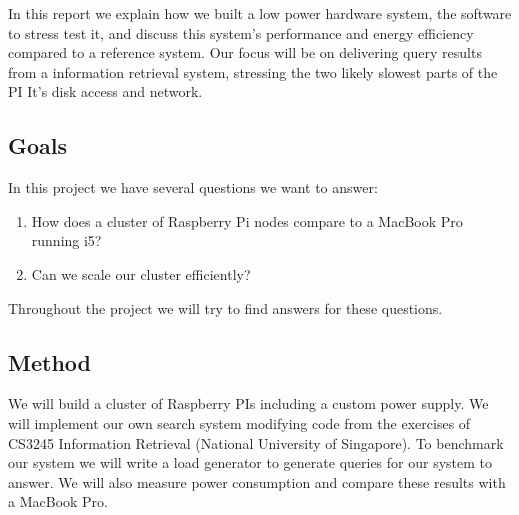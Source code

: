 In this report we explain how we built a low power hardware system, the software to stress test it, and discuss this system's performance and energy efficiency compared to a reference system. Our focus will be on delivering query results from a information retrieval system, stressing the two likely slowest parts of the PI\:
It's disk access and network.

\subsection{Goals}
In this project we have several questions we want to answer:
\begin{enumerate}
\item How does a cluster of Raspberry Pi nodes compare to a MacBook Pro running i5?
\item Can we scale our cluster efficiently?
\end{enumerate}

Throughout the project we will try to find answers for these questions.

\subsection{Method}
We will build a cluster of Raspberry PIs including a custom power supply. We will implement our own search system modifying code from the exercises of CS3245 Information Retrieval (National University of Singapore). To benchmark our system we will write a load generator to generate queries for our system to answer. We will also measure power consumption and compare these results with a MacBook Pro. 


